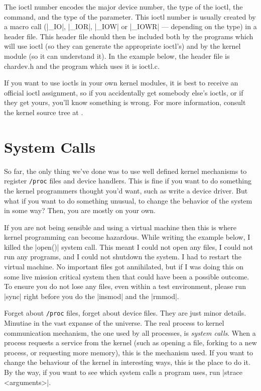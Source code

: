 \documentclass[10pt, oneside]{book}
\begin{document}
The ioctl number encodes the major device number, the type of the ioctl, the command, and the type of the parameter.
This ioctl number is usually created by a macro call (\cpp|_IO|, \cpp|_IOR|, \cpp|_IOW| or \cpp|_IOWR| --- depending on the type) in a header file.
This header file should then be included both by the programs which will use ioctl (so they can generate the appropriate ioctl's) and by the kernel module (so it can understand it).
In the example below, the header file is chardev.h and the program which uses it is ioctl.c.

If you want to use ioctls in your own kernel modules, it is best to receive an official ioctl assignment, so if you accidentally get somebody else's ioctls, or if they get yours, you'll know something is wrong.
For more information, consult the kernel source tree at .




\section{System Calls}
\label{sec:syscall}
So far, the only thing we've done was to use well defined kernel mechanisms to register \verb|/proc| files and device handlers.
This is fine if you want to do something the kernel programmers thought you'd want, such as write a device driver.
But what if you want to do something unusual, to change the behavior of the system in some way?
Then, you are mostly on your own.

If you are not being sensible and using a virtual machine then this is where kernel programming can become hazardous.
While writing the example below, I killed the \cpp|open()| system call.
This meant I could not open any files, I could not run any programs, and I could not shutdown the system.
I had to restart the virtual machine.
No important files got annihilated, but if I was doing this on some live mission critical system then that could have been a possible outcome.
To ensure you do not lose any files, even within a test environment, please run \sh|sync| right before you do the \sh|insmod| and the \sh|rmmod|.

Forget about \verb|/proc| files, forget about device files.
They are just minor details.
Minutiae in the vast expanse of the universe.
The real process to kernel communication mechanism, the one used by all processes, is \emph{system calls}.
When a process requests a service from the kernel (such as opening a file, forking to a new process, or requesting more memory), this is the mechanism used.
If you want to change the behaviour of the kernel in interesting ways, this is the place to do it.
By the way, if you want to see which system calls a program uses, run \sh|strace <arguments>|.
\end{document}

